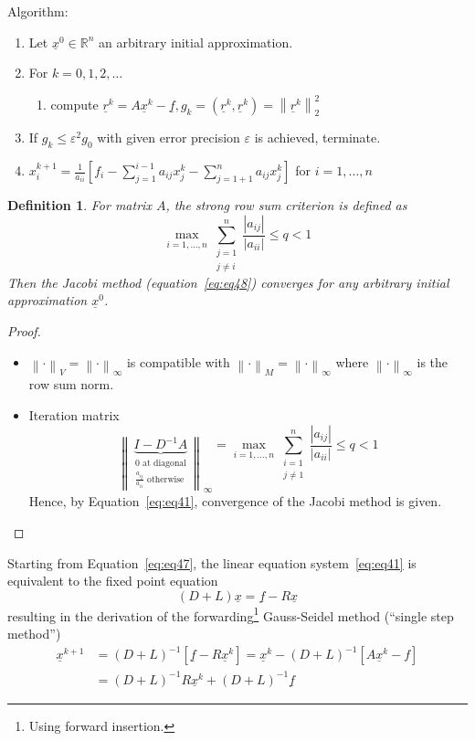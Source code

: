 \documentclass{article}
\newtheorem*{definition}{Definition}
\newcommand{\card}[1]{\left|#1\right|}
\newcommand{\norm}[1]{\left\|#1\right\|}
\begin{document}
Algorithm:
\begin{enumerate}
  \item Let $\underline{x}^0 \in \mathbb R^n$ an arbitrary initial approximation.
  \item For $k = 0,1,2,\ldots$
    \begin{enumerate}
       \item compute $\underline{r}^k = A \underline{x}^k - \underline{f}, g_k = (\underline{r}^k, \underline{r}^k) = \norm{\underline{r}^k}_2^2$
     \end{enumerate}
  \item If $g_k \leq \varepsilon^2 g_0$ with given error precision $\varepsilon$ is achieved, terminate.
  \item $x_i^{k+1} = \frac{1}{a_{ii}} \left[f_i - \sum_{j=1}^{i-1} a_{ij} x_j^k - \sum_{j=1+1}^n a_{ij} x_j^k\right]$ for $i=1,\ldots,n$
\end{enumerate}

\begin{definition} %
  \label{satz42}
  For matrix $A$, the \emph{strong row sum criterion} is defined as
  \[ \max_{i=1,\ldots,n} \sum_{\substack{j=1 \\ j \neq i}}^n \frac{\card{a_{ij}}}{\card{a_{ii}}} \leq q < 1 \]
  Then the Jacobi method (equation~\ref{eq:eq48}) converges for any arbitrary initial approximation $\underline{x}^0$.
\end{definition}

\begin{proof}
  \begin{itemize}
    \item $\norm{\cdot}_V = \norm{\cdot}_{\infty}$ is compatible with $\norm{\cdot}_M = \norm{\cdot}_\infty$ where $\norm{\cdot}_\infty$ is the row sum norm.
    \item Iteration matrix
      \[ \norm{\underbrace{I - D^{-1} A}_{\substack{0 \text{ at diagonal} \\ \frac{a_{ij}}{a_{ii}} \text{ otherwise}}}}_\infty = \max_{i=1,\ldots,n} \sum_{\substack{i=1 \\ j\neq 1}}^n \frac{\card{a_{ij}}}{\card{a_{ii}}} \leq q < 1 \]
      Hence, by Equation~\ref{eq:eq41}, convergence of the Jacobi method is given.
  \end{itemize}
\end{proof}

Starting from Equation~\ref{eq:eq47}, the linear equation system~\ref{eq:eq41} is equivalent to the fixed point equation
\[ (D + L) \underline{x} = \underline{f} - R \underline{x} \]
resulting in the derivation of the forwarding\footnote{Using forward insertion.} Gauss-Seidel method (\enquote{single step method})
\begin{align}
  \underline{x}^{k+1} &= (D + L)^{-1} \left[\underline{f} - R \underline{x}^k\right] = \underline{x}^k - (D + L)^{-1} [A \underline{x}^k - f] \\
    &= (D + L)^{-1} R \underline{x}^k + (D + L)^{-1} \underline{f} \label{eq:eq49}
\end{align}
\end{document}
